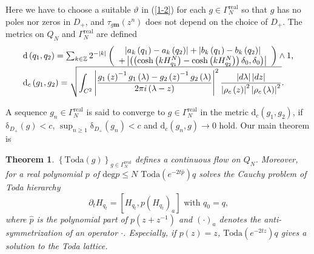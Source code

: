 \documentclass[a4paper]{article}%
\newtheorem{theorem}{Theorem}
\begin{document}
Here we have to choose a suitable $\vartheta$ in (\ref{1-2}) for each
$g\in\Gamma_{N}^{\operatorname{real}}$ so that $g$ has no poles nor zeros in
$D_{+}$, and $\tau_{g\boldsymbol{m}}\left(  z^{n}\right)  $ does not depend on
the choice of $D_{+}$. The metrics on $Q_{N}$ and $\Gamma_{N}%
^{\operatorname{real}}$ are defined%
\[%
\begin{array}
[c]{l}%
\mathrm{d}\left(  q_{1},q_{2}\right)  =\sum_{k\in\mathbb{Z}}2^{-\left\vert
k\right\vert }\left(
\begin{array}
[c]{c}%
\left\vert a_{k}\left(  q_{1}\right)  -a_{k}\left(  q_{2}\right)  \right\vert
+\left\vert b_{k}\left(  q_{1}\right)  -b_{k}\left(  q_{2}\right)  \right\vert
\\
+\left\vert \left(  \left(  \cosh\left(  kH_{q_{1}}^{N}\right)  -\cosh\left(
kH_{q_{2}}^{N}\right)  \right)  \delta_{0},\delta_{0}\right)  \right\vert
\end{array}
\right)  \wedge1\text{,}\\
\mathrm{d}_{c}\left(  g_{1},g_{2}\right)  =\sqrt{%
{\displaystyle\int_{C^{2}}}
\left\vert \dfrac{g_{1}\left(  z\right)  ^{-1}g_{1}\left(  \lambda\right)
-g_{2}\left(  z\right)  ^{-1}g_{2}\left(  \lambda\right)  }{2\pi i\left(
\lambda-z\right)  }\right\vert ^{2}\dfrac{\left\vert d\lambda\right\vert
\left\vert dz\right\vert }{\left\vert \rho_{c}\left(  z\right)  \right\vert
^{2}\left\vert \rho_{c}\left(  \lambda\right)  \right\vert ^{2}}}\text{.}%
\end{array}
\]


A sequence $g_{n}\in\Gamma_{N}^{\operatorname{real}}$ is said to converge to
$g\in\Gamma_{N}^{\operatorname{real}}$ in the metric $\mathrm{d}_{c}\left(
g_{1},g_{2}\right)  $, if $\mathrm{\delta}_{D_{+}}\left(  g\right)  <c$,
$\sup_{n\geq1}\mathrm{\delta}_{D_{+}}\left(  g_{n}\right)  <c$ and
$\mathrm{d}_{c}\left(  g_{n},g\right)  \rightarrow0$ hold. Our main theorem is

\begin{theorem}
\label{t1}$\left\{  \mathrm{Toda}\left(  g\right)  \right\}  _{g\in\Gamma
_{N}^{\operatorname{real}}}$ defines a continuous flow on $Q_{N}$. Moreover,
for a real polynomial $p$ of $\mathrm{deg}$\textrm{\thinspace}$p\leq N$
$\mathrm{Toda}\left(  e^{-2t\widehat{p}}\right)  q$ solves the Cauchy problem
of Toda hierarchy%
\begin{equation}
\partial_{t}H_{q_{t}}=\left[  H_{q_{t}},p\left(  H_{q_{t}}\right)
_{a}\right]  \text{ \ with }q_{0}=q\text{,} \label{1-18}%
\end{equation}
where $\widehat{p}$ is the polynomial part of $p\left(  z+z^{-1}\right)  $ and
$\left(  \cdot\right)  _{a}$ denotes the anti-symmetrization of an operator
$\cdot$. Especially, if $p(z)=z$, $\mathrm{Toda}\left(  e^{-2tz}\right)  q$
gives a solution to the Toda lattice.
\end{theorem}
\end{document}

